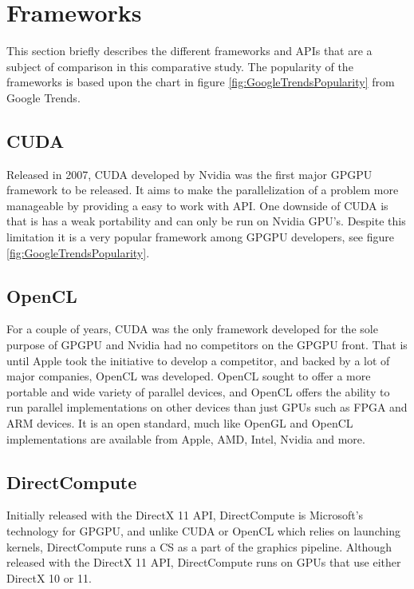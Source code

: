 \section{Frameworks}
This section briefly describes the different frameworks and APIs that are a subject of comparison in this comparative study. The popularity of the frameworks is based upon the chart in figure \ref{fig:GoogleTrendsPopularity} from Google Trends.

\subsection{CUDA}
Released in 2007, CUDA developed by Nvidia was the first major GPGPU framework to be released. It aims to make the parallelization of a problem more manageable by providing a easy to work with API. One downside of CUDA is that is has a weak portability and can only be run on Nvidia GPU's. Despite this limitation it is a very popular framework among GPGPU developers, see figure \ref{fig:GoogleTrendsPopularity}. \cite{AboutCuda} 

\subsection{OpenCL}
For a couple of years, CUDA was the only framework developed for the sole purpose of GPGPU and Nvidia had no competitors on the GPGPU front. That is until Apple took the initiative to develop a competitor, and backed by a lot of major companies, OpenCL was developed. OpenCL sought to offer a more portable and wide variety of parallel devices, and OpenCL offers the ability to run parallel implementations on other devices than just GPUs such as FPGA and ARM devices. It is an open standard, much like OpenGL and OpenCL implementations are available from Apple, AMD, Intel, Nvidia and more. \cite{KhronosOpenCL}



\subsection{DirectCompute}
Initially released with the DirectX 11 API, DirectCompute is Microsoft's technology for GPGPU, and unlike CUDA or OpenCL which relies on launching kernels, DirectCompute runs a CS as a part of the graphics pipeline. Although released with the DirectX 11 API, DirectCompute runs on GPUs that use either DirectX 10 or 11. \cite{NVidiaDirectCompute} 

